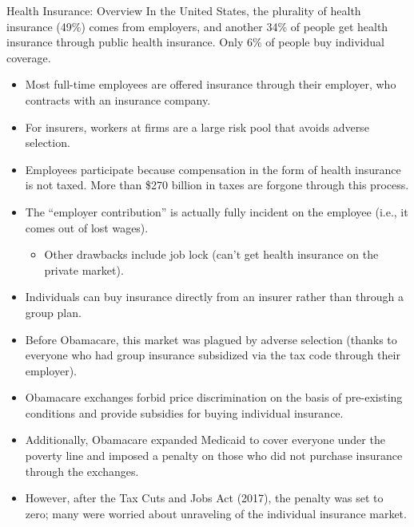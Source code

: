 \documentclass[10pt]{extarticle}
\begin{document}
\begin{problem}{Health Insurance: Overview}
    In the United States, the plurality of health insurance (49\%) comes from employers, and another 34\% of people get health insurance through public health insurance. Only 6\% of people buy individual coverage.
    \begin{itemize}
      \item Most full-time employees are offered insurance through their employer, who contracts with an insurance company.
      \item For insurers, workers at firms are a large risk pool that avoids adverse selection.
      \item Employees participate because compensation in the form of health insurance is not taxed. More than \$270 billion in taxes are forgone through this process.
      \item The ``employer contribution'' is actually fully incident on the employee (i.e., it comes out of lost wages).
        \begin{itemize}
          \item Other drawbacks include job lock (can't get health insurance on the private market).
        \end{itemize}
      \item Individuals can buy insurance directly from an insurer rather than through a group plan.
      \item Before Obamacare, this market was plagued by adverse selection (thanks to everyone who had group insurance subsidized via the tax code through their employer).
      \item Obamacare exchanges forbid price discrimination on the basis of pre-existing conditions and provide subsidies for buying individual insurance.
      \item Additionally, Obamacare expanded Medicaid to cover everyone under the poverty line and imposed a penalty on those who did not purchase insurance through the exchanges.
      \item However, after the Tax Cuts and Jobs Act (2017), the penalty was set to zero; many were worried about unraveling of the individual insurance market.
    \end{itemize}
  \end{problem}
\end{document}

